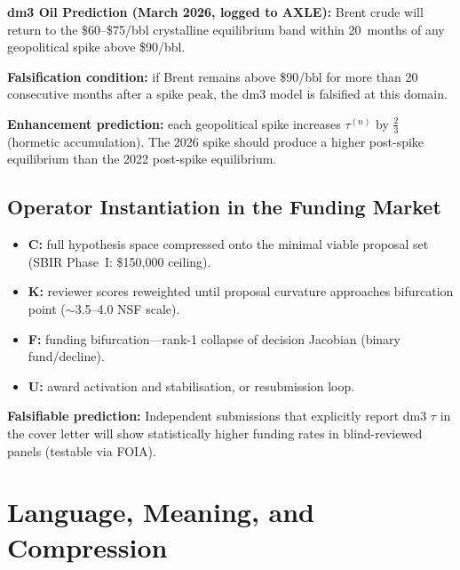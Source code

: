 \documentclass[11pt, twoside, openright]{book}
\theoremstyle{plain}
\theoremstyle{definition}
\newenvironment{notebox}[1][]{%
  \begin{mdframed}[backgroundcolor=SeedBox!50,linecolor=PrincipiaSlate,linewidth=0.5pt,innertopmargin=6pt,innerbottommargin=6pt]
  \ifx\relax#1\relax\else\noindent\textbf{#1}\par\medskip\fi}{\end{mdframed}}
\begin{document}
\begin{notebox}
\textbf{dm3 Oil Prediction (March 2026, logged to AXLE):}
Brent crude will return to the \$60--\$75/bbl crystalline equilibrium
band within 20~months of any geopolitical spike above \$90/bbl.

\textbf{Falsification condition:} if Brent remains above \$90/bbl for
more than 20 consecutive months after a spike peak, the dm3 model is
falsified at this domain.

\textbf{Enhancement prediction:} each geopolitical spike increases
$\tau^{(n)}$ by $\tfrac{2}{3}$ (hormetic accumulation). The 2026 spike
should produce a higher post-spike equilibrium than the 2022 post-spike
equilibrium.
\end{notebox}

\section{Operator Instantiation in the Funding Market}

\begin{itemize}[leftmargin=*]
  \item \textbf{C:} full hypothesis space compressed onto the minimal
    viable proposal set (SBIR Phase~I: \$150,000 ceiling).
  \item \textbf{K:} reviewer scores reweighted until proposal curvature
    approaches bifurcation point ($\sim$3.5--4.0 NSF scale).
  \item \textbf{F:} funding bifurcation---rank-1 collapse of decision
    Jacobian (binary fund/decline).
  \item \textbf{U:} award activation and stabilisation, or resubmission
    loop.
\end{itemize}

\textbf{Falsifiable prediction:} Independent submissions that explicitly
report dm3 $\tau$ in the cover letter will show statistically higher
funding rates in blind-reviewed panels (testable via FOIA).


\chapter{Language, Meaning, and Compression}
\end{document}
